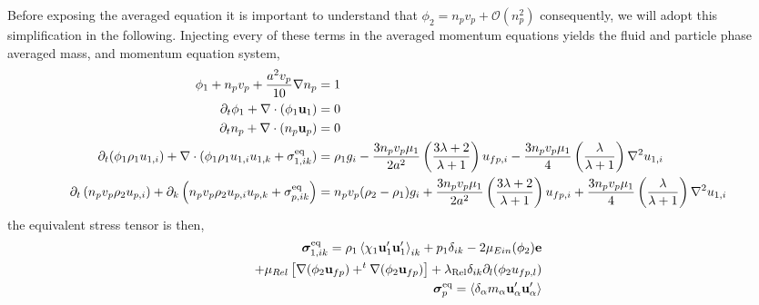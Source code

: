 Before exposing the averaged equation it is important to understand that $\phi_2 = n_p v_p + \mathcal{O}(n_p^2)$ consequently, we will adopt this simplification in the following. 
Injecting every of these terms in the averaged momentum equations yields the fluid and particle phase averaged mass, and momentum equation system, 
\begin{align*}
    \phi_1
    + n_pv_p + \frac{a^2 v_p}{10}\nabla n_p
    &= 1
    \\
    \partial_t \phi_1
    + \mathbf{\nabla}\cdot (
        \phi_1\textbf{u}_1
    )
    &= 
    0\\
    \partial_t n_p
    + \mathbf{\nabla}\cdot (
        n_p\textbf{u}_p
    )
    &= 
    0\\
    \partial_t (\phi_1 \rho_1u_{1,i})  
    + \mathbf{\nabla}\cdot (
        \phi_1 \rho_1u_{1,i}u_{1,k}
        + {\sigma}_{1,ik}^\text{eq}
    )
    &=  \rho_1 g_i 
    -  \frac{3n_p v_p \mu_1}{2 a^2} 
    \left(\frac{3\lambda+2}{\lambda+1}\right) u_{f p,i} 
    - \frac{3n_p v_p \mu_1}{4} \left(\frac{\lambda}{\lambda+1}\right)\mathbf{\nabla}^2u_{1,i}\\
    \partial_t \left(n_p v_p \rho_2 {u}_{p,i}\right)
    + \partial_{k} \left(n_p v_p \rho_2 {u}_{p,i} {u}_{p,k} 
    + {\sigma}_{p,ik}^\text{eq}
    \right)
    &= 
    n_p v_p (\rho_2 -\rho_1)g_i 
    + \frac{3n_p v_p \mu_1}{2 a^2} 
    \left(\frac{3\lambda+2}{\lambda+1}\right) u_{f p,i} 
    + \frac{3n_p v_p \mu_1}{4} \left(\frac{\lambda}{\lambda+1}\right)\mathbf{\nabla}^2u_{1,i}
\end{align*}
the equivalent stress tensor is then, 
\begin{align*}
    \bm{\sigma}^\text{eq}_{1,ik} =
    \rho_1\left<\chi_1\textbf{u}_1'\textbf{u}_1'\right>_{ik} 
    + p_1 \delta_{ik}
    - 2 \mu_{Ein}(\phi_2) \textbf{e}\\
    + \mu_{Rel} \left[\mathbf{\nabla} (\phi_2\textbf{u}_{fp}) + ^t\mathbf{\nabla} (\phi_2\textbf{u}_{fp})\right]
    + \lambda_\text{Rel}
        \delta_{ik} \partial_l(\phi_2 u_{fp,l})\\
    \bm\sigma_p^\text{eq}
    = \left<\delta_\alpha m_\alpha\textbf{u}_\alpha'\textbf{u}_\alpha'\right>
\end{align*}

